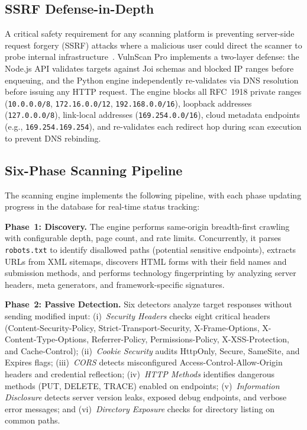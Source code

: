 \documentclass[conference]{IEEEtran}
\begin{document}
\subsection{SSRF Defense-in-Depth}

A critical safety requirement for any scanning platform is preventing server-side request forgery (SSRF) attacks where a malicious user could direct the scanner to probe internal infrastructure~\cite{ssrfattack2020}. VulnScan Pro implements a two-layer defense: the Node.js API validates targets against Joi schemas and blocked IP ranges before enqueuing, and the Python engine independently re-validates via DNS resolution before issuing any HTTP request. The engine blocks all RFC~1918 private ranges (\texttt{10.0.0.0/8}, \texttt{172.16.0.0/12}, \texttt{192.168.0.0/16}), loopback addresses (\texttt{127.0.0.0/8}), link-local addresses (\texttt{169.254.0.0/16}), cloud metadata endpoints (e.g., \texttt{169.254.169.254}), and re-validates each redirect hop during scan execution to prevent DNS rebinding.

\subsection{Six-Phase Scanning Pipeline}

The scanning engine implements the following pipeline, with each phase updating progress in the database for real-time status tracking:

\textbf{Phase~1: Discovery.} The engine performs same-origin breadth-first crawling with configurable depth, page count, and rate limits. Concurrently, it parses \texttt{robots.txt} to identify disallowed paths (potential sensitive endpoints), extracts URLs from XML sitemaps, discovers HTML forms with their field names and submission methods, and performs technology fingerprinting by analyzing server headers, meta generators, and framework-specific signatures.

\textbf{Phase~2: Passive Detection.} Six detectors analyze target responses without sending modified input: (i)~\textit{Security Headers} checks eight critical headers (Content-Security-Policy, Strict-Transport-Security, X-Frame-Options, X-Content-Type-Options, Referrer-Policy, Permissions-Policy, X-XSS-Protection, and Cache-Control); (ii)~\textit{Cookie Security} audits HttpOnly, Secure, SameSite, and Expires flags; (iii)~\textit{CORS} detects misconfigured Access-Control-Allow-Origin headers and credential reflection; (iv)~\textit{HTTP Methods} identifies dangerous methods (PUT, DELETE, TRACE) enabled on endpoints; (v)~\textit{Information Disclosure} detects server version leaks, exposed debug endpoints, and verbose error messages; and (vi)~\textit{Directory Exposure} checks for directory listing on common paths.
\end{document}
